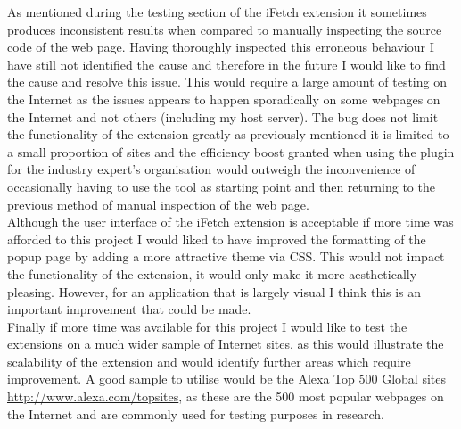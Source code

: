 \documentclass[12pt]{article}
\begin{document}
As mentioned during the testing section of the iFetch extension it sometimes produces inconsistent results when compared to manually inspecting the source code of the web page. Having thoroughly inspected this erroneous behaviour I have still not identified the cause and therefore in the future I would like to find the cause and resolve this issue. This would require a large amount of testing on the Internet as the issues appears to happen sporadically on some webpages on the Internet and not others (including my host server). The bug does not limit the functionality of the extension greatly as previously mentioned it is limited to a small proportion of sites and the efficiency boost granted when using the plugin for the industry expert's organisation would outweigh the inconvenience of occasionally having to use the tool as starting point and then returning to the previous method of manual inspection of the web page. \\  

Although the user interface of the iFetch extension is acceptable if more time was afforded to this project I would liked to have improved the formatting of the popup page by adding a more attractive theme via CSS. This would not impact the functionality of the extension, it would only make it more aesthetically pleasing. However, for an application that is largely visual I think this is an important improvement that could be made. \\

Finally if more time was available for this project I would like to test the extensions on a much wider sample of Internet sites, as this would illustrate the scalability of the extension and would identify further areas which require improvement. A good sample to utilise would be the Alexa Top 500 Global sites \url{http://www.alexa.com/topsites}, as these are the 500 most popular webpages on the Internet and are commonly used for testing purposes in research.  

\pagebreak
\end{document}
